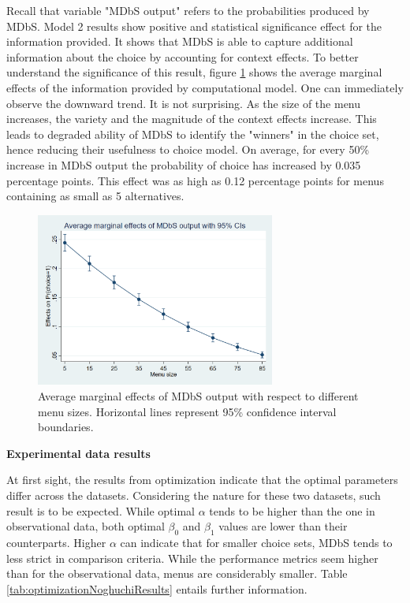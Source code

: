 \documentclass[a4paper,12pt]{article}
\begin{document}
Recall that variable "MDbS output" refers to the probabilities produced by MDbS. Model 2 results show positive and statistical significance effect for the information provided. It shows that MDbS is able to capture additional information about the choice by accounting for context effects. To better understand the significance of this result, figure \ref{fig:marginsAmadeusGraph} shows the average marginal effects of the information provided by computational model. One can immediately observe the downward trend. It is not surprising. As the size of the menu increases, the variety and the magnitude of the context effects increase. This leads to degraded ability of MDbS to identify the "winners" in the choice set, hence reducing their usefulness to choice model. On average, for every 50\% increase in MDbS output the probability of choice has increased by 0.035 percentage points. This effect was as high as 0.12 percentage points for menus containing as small as 5 alternatives. 

\begin{figure}[h]
    \centering
    \includegraphics[width=0.7\textwidth]{staticFiles/marginsAmadeusGraph.png}
    \caption{Average marginal effects of MDbS output with respect to different menu sizes. Horizontal lines represent 95\% confidence interval boundaries.} %
    \label{fig:marginsAmadeusGraph} %

\end{figure}

\textbf{Experimental data results}

At first sight, the results from optimization indicate that the optimal parameters differ across the datasets. Considering the nature for these two datasets, such result is to be expected. While optimal $\alpha$ tends to be higher than the one in observational data, both optimal $\beta_0$ and $\beta_1$ values are lower than their counterparts. Higher $\alpha$ can indicate that for smaller choice sets, MDbS tends to less strict in comparison criteria. While the performance metrics seem higher than for the observational data, menus are considerably smaller. Table \ref{tab:optimizationNoghuchiResults} entails further information.
\end{document}

